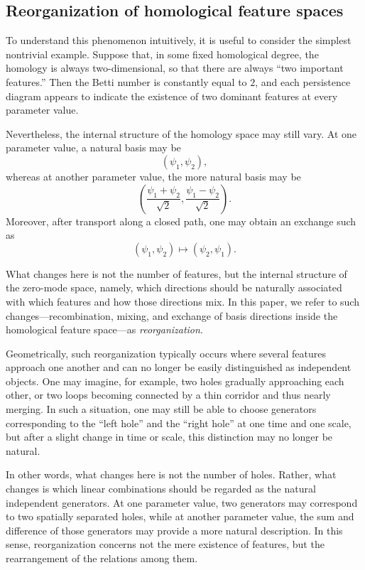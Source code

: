 \documentclass[pdflatex,sn-mathphys-num]{sn-jnl}%
\theoremstyle{thmstyleone}%
\theoremstyle{thmstyletwo}%
\theoremstyle{thmstylethree}%
\begin{document}
\subsection{Reorganization of homological feature spaces}

To understand this phenomenon intuitively, it is useful to consider the simplest nontrivial example. Suppose that, in some fixed homological degree, the homology is always two-dimensional, so that there are always ``two important features.'' Then the Betti number is constantly equal to \(2\), and each persistence diagram appears to indicate the existence of two dominant features at every parameter value.

Nevertheless, the internal structure of the homology space may still vary. At one parameter value, a natural basis may be
\[
(\psi_1,\psi_2),
\]
whereas at another parameter value, the more natural basis may be
\[
\left(\frac{\psi_1+\psi_2}{\sqrt2},\frac{\psi_1-\psi_2}{\sqrt2}\right).
\]
Moreover, after transport along a closed path, one may obtain an exchange such as
\[
(\psi_1,\psi_2)\mapsto (\psi_2,\psi_1).
\]

What changes here is not the number of features, but the internal structure of the zero-mode space, namely, which directions should be naturally associated with which features and how those directions mix. In this paper, we refer to such changes---recombination, mixing, and exchange of basis directions inside the homological feature space---as \emph{reorganization}.

Geometrically, such reorganization typically occurs where several features approach one another and can no longer be easily distinguished as independent objects. One may imagine, for example, two holes gradually approaching each other, or two loops becoming connected by a thin corridor and thus nearly merging. In such a situation, one may still be able to choose generators corresponding to the ``left hole'' and the ``right hole'' at one time and one scale, but after a slight change in time or scale, this distinction may no longer be natural.

In other words, what changes here is not the number of holes. Rather, what changes is which linear combinations should be regarded as the natural independent generators. At one parameter value, two generators may correspond to two spatially separated holes, while at another parameter value, the sum and difference of those generators may provide a more natural description. In this sense, reorganization concerns not the mere existence of features, but the rearrangement of the relations among them.
\end{document}

